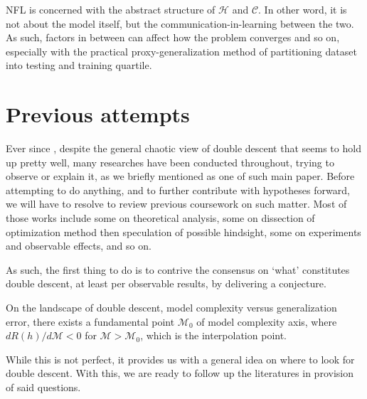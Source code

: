 \documentclass[10pt]{article} %
\begin{document}
NFL is concerned with the abstract structure of $\mathcal{H}$ and $\mathcal{C}$. In other word, it is not about the model itself, but the communication-in-learning between the two. As such, factors in between can affect how the problem converges and so on, especially with the practical proxy-generalization method of partitioning dataset into testing and training quartile. 

\section{Previous attempts}

Ever since \cite{belkin_reconciling_2019}, despite the general chaotic view of double descent that seems to hold up pretty well, many researches have been conducted throughout, trying to observe or explain it, as we briefly mentioned \cite{nakkiran_deep_2019} as one of such main paper. Before attempting to do anything, and to further contribute with hypotheses forward, we will have to resolve to review previous coursework on such matter. Most of those works include some on theoretical analysis, some on dissection of optimization method then speculation of possible hindsight, some on experiments and observable effects, and so on. 

As such, the first thing to do is to contrive the consensus on `what' constitutes double descent, at least per observable results, by delivering a conjecture. 

\begin{conjecture}
    On the landscape of double descent, model complexity versus generalization error, there exists a fundamental point $\mathcal{M}_{0}$ of model complexity axis, where $dR(h)/d\mathcal{M}< 0$ for $\mathcal{M}> \mathcal{M}_{0}$, which is the interpolation point. 
\end{conjecture}

While this is not perfect, it provides us with a general idea on where to look for double descent. With this, we are ready to follow up the literatures in provision of said questions. 
\end{document}
